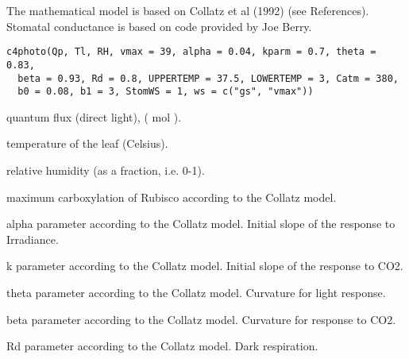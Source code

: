 \documentclass[letterpaper]{book}
\begin{document}
%
\begin{Description}\relax
The mathematical model is based on Collatz et al (1992)
(see References). Stomatal conductance is based on code
provided by Joe Berry.
\end{Description}
%
\begin{Usage}
\begin{verbatim}
c4photo(Qp, Tl, RH, vmax = 39, alpha = 0.04, kparm = 0.7, theta = 0.83,
  beta = 0.93, Rd = 0.8, UPPERTEMP = 37.5, LOWERTEMP = 3, Catm = 380,
  b0 = 0.08, b1 = 3, StomWS = 1, ws = c("gs", "vmax"))
\end{verbatim}
\end{Usage}
%
\begin{Arguments}
\begin{ldescription}
\item[\code{Qp}] quantum flux (direct light), (\eqn{\mu}{}
mol  ).

\item[\code{Tl}] temperature of the leaf (Celsius).

\item[\code{RH}] relative humidity (as a fraction, i.e. 0-1).

\item[\code{vmax}] maximum carboxylation of Rubisco according to
the Collatz model.

\item[\code{alpha}] alpha parameter according to the Collatz
model. Initial slope of the response to Irradiance.

\item[\code{kparm}] k parameter according to the Collatz model.
Initial slope of the response to CO2.

\item[\code{theta}] theta parameter according to the Collatz
model. Curvature for light response.

\item[\code{beta}] beta parameter according to the Collatz
model. Curvature for response to CO2.

\item[\code{Rd}] Rd parameter according to the Collatz model.
Dark respiration.

\item[\code{UPPERTEMP}] 

\item[\code{LOWERTEMP}] 


\end{ldescription}
\end{Arguments}
\end{document}
